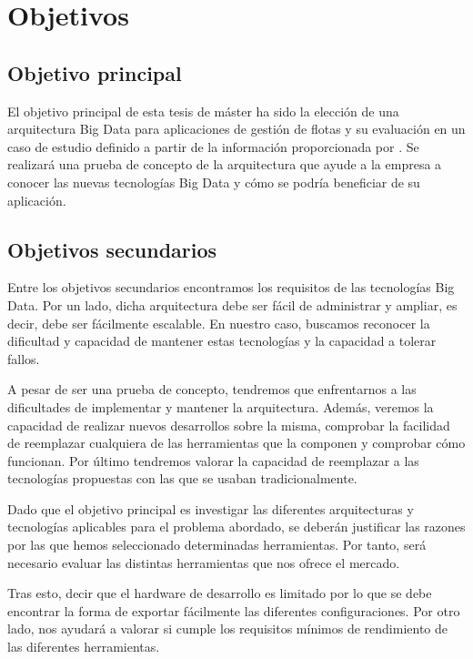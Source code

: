 \section{Objetivos\label{objetivos}}

\subsection{Objetivo principal\label{obj_princ}}

El objetivo principal de esta tesis de máster ha sido la elección de
una arquitectura Big Data para aplicaciones de gestión de flotas y su
evaluación en un caso de estudio definido a partir de la información
proporcionada por \mdata{}. Se realizará una prueba de concepto de la
arquitectura que ayude a la empresa a conocer las nuevas tecnologías
Big Data y cómo se podría beneficiar de su aplicación.

\subsection{Objetivos secundarios\label{obj_sec}}

Entre los objetivos secundarios encontramos los requisitos de las
tecnologías Big Data. Por un lado, dicha arquitectura debe ser fácil
de administrar y ampliar, es decir, debe ser fácilmente escalable. En
nuestro caso, buscamos reconocer la dificultad y capacidad de mantener
estas tecnologías y la capacidad a tolerar fallos.

A pesar de ser una prueba de concepto, tendremos que enfrentarnos a
las dificultades de implementar y mantener la arquitectura. Además,
veremos la capacidad de realizar nuevos desarrollos sobre la misma,
comprobar la facilidad de reemplazar cualquiera de las herramientas
que la componen y comprobar cómo funcionan. Por último tendremos
valorar la capacidad de reemplazar a las tecnologías propuestas con
las que se usaban tradicionalmente.

Dado que el objetivo principal es investigar las diferentes
arquitecturas y tecnologías aplicables para el problema abordado, se
deberán justificar las razones por las que hemos seleccionado
determinadas herramientas. Por tanto, será necesario evaluar las
distintas herramientas que nos ofrece el mercado.

Tras esto, decir que el hardware de desarrollo es limitado por lo que
se debe encontrar la forma de exportar fácilmente las diferentes
configuraciones. Por otro lado, nos ayudará a valorar si cumple los
requisitos mínimos de rendimiento de las diferentes herramientas.

